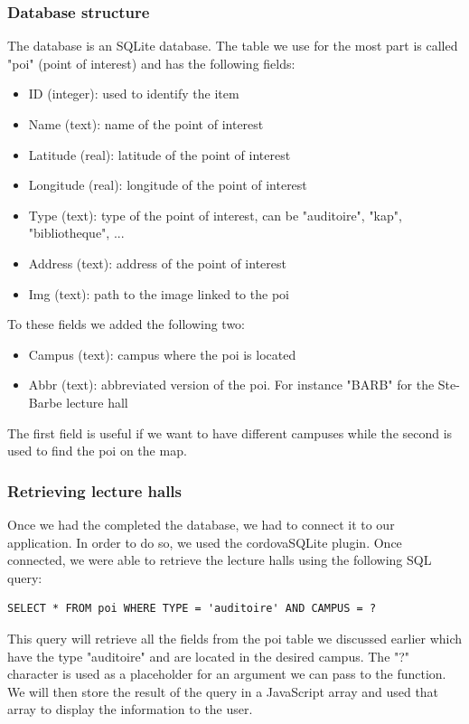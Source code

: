 \documentclass[11pt, a4paper]{report}
\begin{document}
\subsubsection{Database structure}
 
The database is an SQLite database. The table we use for the most part is called "poi" (point of interest) and has the following fields:

\begin{itemize}
\item ID (integer): used to identify the item
\item Name (text): name of the point of interest
\item Latitude (real): latitude of the point of interest
\item Longitude (real): longitude of the point of interest
\item Type (text): type of the point of interest, can be "auditoire", "kap",   "bibliotheque", ...
\item Address (text): address of the point of interest
\item Img (text): path to the image linked to the poi
\end{itemize}

To these fields we added the following two:
\begin{itemize}
\item Campus (text): campus where the poi is located
\item Abbr (text): abbreviated version of the poi. For instance "BARB" for the Ste-Barbe lecture hall
\end{itemize}

The first field is useful if we want to have different campuses while the second is used to find the poi on the map.

\subsubsection{Retrieving lecture halls}

Once we had the completed the database, we had to connect it to our application. In order to do so, we used the cordovaSQLite plugin. Once connected, we were able to retrieve the lecture halls using the following SQL query: 
\begin{verbatim}
SELECT * FROM poi WHERE TYPE = 'auditoire' AND CAMPUS = ?
\end{verbatim}

This query will retrieve all the fields from the poi table we discussed earlier which have the type "auditoire" and are located in the desired campus. The "?" character is used as a placeholder for an argument we can pass to the function. We will then store the result of the query in a JavaScript array and used that array to display the information to the user.
\end{document}
